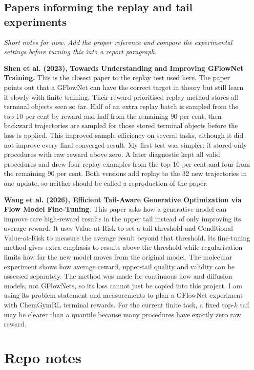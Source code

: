 \documentclass{article}
\begin{document}
\subsection{Papers informing the replay and tail experiments}

\textit{Short notes for now. Add the proper reference and compare the experimental settings before turning this into a report paragraph.}

\textbf{Shen et al. (2023), Towards Understanding and Improving GFlowNet Training.} This is the closest paper to the replay test used here. The paper points out that a GFlowNet can have the correct target in theory but still learn it slowly with finite training. Their reward-prioritised replay method stores all terminal objects seen so far. Half of an extra replay batch is sampled from the top 10 per cent by reward and half from the remaining 90 per cent, then backward trajectories are sampled for those stored terminal objects before the loss is applied. This improved sample efficiency on several tasks, although it did not improve every final converged result. My first test was simpler: it stored only procedures with raw reward above zero. A later diagnostic kept all valid procedures and drew four replay examples from the top 10 per cent and four from the remaining 90 per cent. Both versions add replay to the 32 new trajectories in one update, so neither should be called a reproduction of the paper.

\textbf{Wang et al. (2026), Efficient Tail-Aware Generative Optimization via Flow Model Fine-Tuning.} This paper asks how a generative model can improve rare high-reward results in the upper tail instead of only improving its average reward. It uses Value-at-Risk to set a tail threshold and Conditional Value-at-Risk to measure the average result beyond that threshold. Its fine-tuning method gives extra emphasis to results above the threshold while regularisation limits how far the new model moves from the original model. The molecular experiment shows how average reward, upper-tail quality and validity can be assessed separately. The method was made for continuous flow and diffusion models, not GFlowNets, so its loss cannot just be copied into this project. I am using its problem statement and measurements to plan a GFlowNet experiment with ChemGymRL terminal rewards. For the current finite task, a fixed top-$k$ tail may be clearer than a quantile because many procedures have exactly zero raw reward.

\section{Repo notes}
\end{document}

